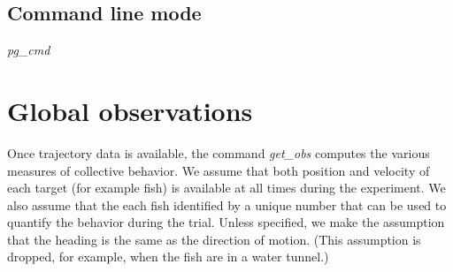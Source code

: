 \documentclass[12pt]{article}
\begin{document}
\subsection{Command line mode}
\emph{pg\_cmd}
\section{Global observations}

Once trajectory data is available, the command \emph{get\_obs} computes the  various measures of collective behavior. We assume that both position and velocity of each target (for example fish) is available at all times during the experiment. We also assume that the each fish identified by a unique number that can be used to quantify the behavior during the trial. Unless specified, we make the assumption that the heading is the same as the direction of motion. (This assumption is dropped, for example, when the fish are in a water tunnel.)
\end{document}

